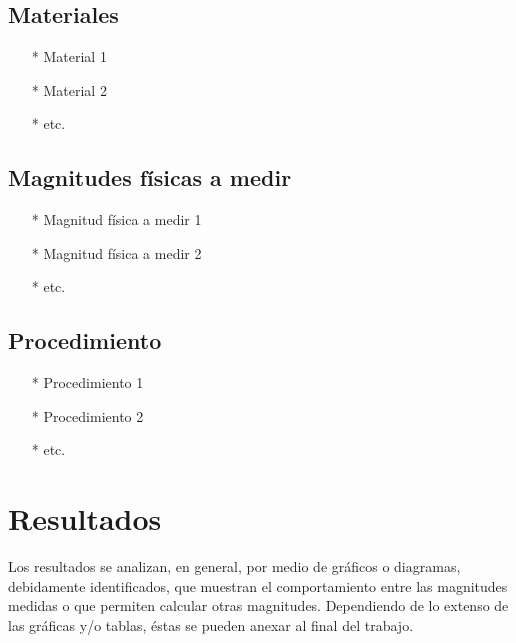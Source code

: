 \documentclass[osajnl,twocolumn,showpacs,superscriptaddress,10pt]{revtex4-1}
\begin{document}

\subsection{Materiales}

\begin{itemize}
    \item[*] Material 1
    \item[*] Material 2
    \item[*] etc.
\end{itemize}


\subsection{Magnitudes físicas a medir}

\begin{itemize}
    \item[*] Magnitud física a medir 1
    \item[*] Magnitud física a medir 2
    \item[*] etc.
\end{itemize}


\subsection{Procedimiento}

\begin{enumerate}
    \item[*] Procedimiento 1
    \item[*] Procedimiento 2
    \item[*] etc.
\end{enumerate}


\section{Resultados}

    Los resultados se analizan, en general, por medio de gráficos o diagramas, debidamente identificados, que muestran el comportamiento entre las magnitudes medidas o que permiten calcular otras magnitudes. Dependiendo de lo extenso de las gráficas y/o tablas, éstas se pueden anexar al final del trabajo.\\
   
\end{document}
